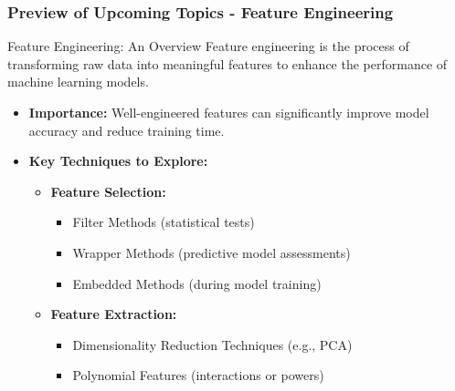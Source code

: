 \documentclass[aspectratio=169]{beamer}
\begin{document}
\begin{frame}[fragile]
  \frametitle{Preview of Upcoming Topics - Feature Engineering}
  
  \begin{block}{Feature Engineering: An Overview}
    Feature engineering is the process of transforming raw data into meaningful features to enhance the performance of machine learning models.
  \end{block}

  \begin{itemize}
    \item \textbf{Importance:} Well-engineered features can significantly improve model accuracy and reduce training time.
    
    \item \textbf{Key Techniques to Explore:}
      \begin{itemize}
        \item \textbf{Feature Selection:}
          \begin{itemize}
            \item Filter Methods (statistical tests)
            \item Wrapper Methods (predictive model assessments)
            \item Embedded Methods (during model training)
          \end{itemize}
          
        \item \textbf{Feature Extraction:}
          \begin{itemize}
            \item Dimensionality Reduction Techniques (e.g., PCA)
            \item Polynomial Features (interactions or powers)
          \end{itemize}
      \end{itemize}
  \end{itemize}
\end{frame}
\end{document}

